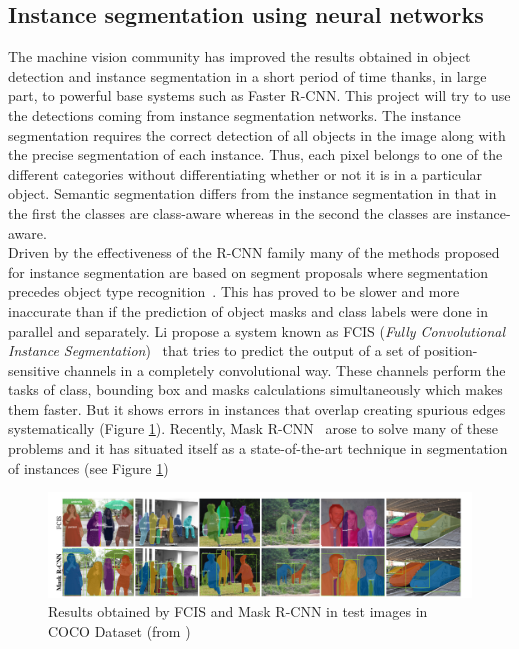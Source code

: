 \subsection{Instance segmentation using neural networks}
The machine vision community has improved the results obtained in object detection and instance segmentation in a short period of time thanks, in large part, to powerful base systems such as Faster R-CNN. This project will try to use the detections coming from instance segmentation networks. The instance segmentation requires the correct detection of all objects in the image along with the precise segmentation of each instance. Thus, each pixel belongs to one of the different categories without differentiating whether or not it is in a particular object. Semantic segmentation differs from the instance segmentation in that in the first the classes are class-aware whereas in the second the classes are instance-aware.\\
Driven by the effectiveness of the R-CNN family many of the methods proposed for instance segmentation are based on segment proposals where segmentation precedes object type recognition~\cite{pinheiro2015learning}. This has proved to be slower and more inaccurate than if the prediction of object masks and class labels were done in parallel and separately. Li \etal{}propose a system known as FCIS (\textit{Fully Convolutional Instance Segmentation})~\cite{li2016fully} that tries to predict the output of a set of position-sensitive channels in a completely convolutional way. These channels perform the tasks of class, bounding box and masks calculations simultaneously which makes them faster. But it shows errors in instances that overlap creating spurious edges systematically (Figure \ref{fig:fcis_mask}).
Recently, Mask R-CNN~\cite{he2017mask} arose to solve many of these problems and it has situated itself as a state-of-the-art technique in segmentation of instances (see Figure \ref{fig:fcis_mask})\\
\begin{figure}[H]
\begin{center}
\includegraphics[scale=0.35]{fcis_vs_maskrcnn.png}
\caption{Results obtained by FCIS and Mask R-CNN in test images in COCO Dataset (from \cite{he2017mask})}
\label{fig:fcis_mask}
\end{center}
\end{figure}
